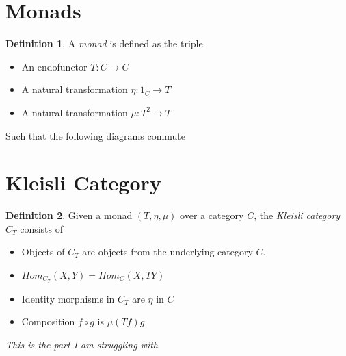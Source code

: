 \documentclass{article}
\theoremstyle{definition}
\newtheorem{definition}{Definition}[section]
\begin{document}
\section{Monads}
\begin{definition}
    A \textit{monad} is defined as the triple
    \begin{itemize}
        \item An endofunctor $T : C \rightarrow C$
        \item A natural transformation $\eta : 1_{C} \rightarrow T$
        \item A natural transformation $\mu : T^2 \rightarrow T$
    \end{itemize}
    Such that the following diagrams commute
    \begin{center}
        \quad
    \end{center}
\end{definition}

\section{Kleisli Category}
\begin{definition}
    Given a monad $(T,\eta,\mu)$ over a category $C$,
    the \textit{Kleisli category} $C_T$ consists of
    \begin{itemize}
        \item Objects of $C_T$ are objects from the underlying category $C$.
        \item $Hom_{C_T}(X,Y) = Hom_C (X,TY)$
        \item Identity morphisms in $C_T$ are $\eta$ in $C$
        \item Composition $f \circ g$ is $\mu(Tf)g$
    \end{itemize}
\end{definition}

\textit{This is the part I am struggling with}
\end{document}
